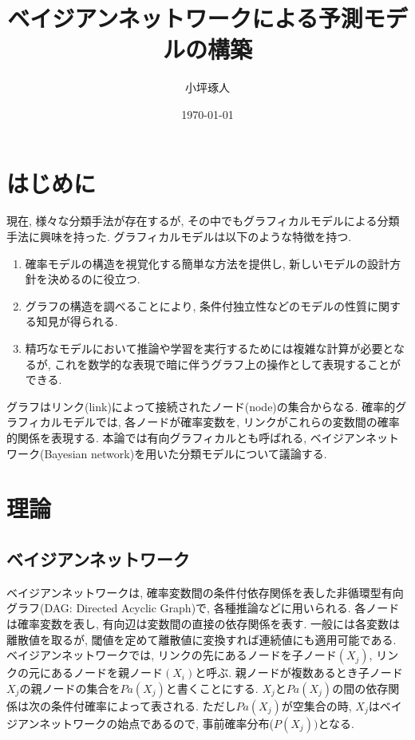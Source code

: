 \documentclass[a4j,12pt]{jarticle}
\title{ベイジアンネットワークによる予測モデルの構築}   %
\author{小坪琢人}   %
\date{\today}   %
\begin{document}
\maketitle   %
\setlength{\baselineskip}{20pt}   %
\tableofcontents   %
\listoffigures   %
\listoftables   %
\clearpage   %


\section{はじめに}

現在, 様々な分類手法が存在するが, その中でもグラフィカルモデルによる分類手法に興味を持った. グラフィカルモデルは以下のような特徴を持つ.~\cite{Bishop1}~\cite{Bishop2}

\begin{enumerate}

\item 確率モデルの構造を視覚化する簡単な方法を提供し, 新しいモデルの設計方針を決めるのに役立つ.

\item グラフの構造を調べることにより, 条件付独立性などのモデルの性質に関する知見が得られる.

\item 精巧なモデルにおいて推論や学習を実行するためには複雑な計算が必要となるが, これを数学的な表現で暗に伴うグラフ上の操作として表現することができる.

\end{enumerate}

グラフはリンク(link)によって接続されたノード(node)の集合からなる. 確率的グラフィカルモデルでは, 各ノードが確率変数を, リンクがこれらの変数間の確率的関係を表現する. 本論では有向グラフィカルとも呼ばれる, ベイジアンネットワーク(Bayesian network)を用いた分類モデルについて議論する.

\section{理論}

\subsection{ベイジアンネットワーク}

ベイジアンネットワークは, 確率変数間の条件付依存関係を表した非循環型有向グラフ(DAG: Directed Acyclic Graph)で, 各種推論などに用いられる. 各ノードは確率変数を表し, 有向辺は変数間の直接の依存関係を表す. 一般には各変数は離散値を取るが, 閾値を定めて離散値に変換すれば連続値にも適用可能である. ベイジアンネットワークでは, リンクの先にあるノードを子ノード$(X_j)$, リンクの元にあるノードを親ノード$(X_i)$と呼ぶ. 親ノードが複数あるとき子ノード$X_j$の親ノードの集合を$Pa(X_j)$と書くことにする. $X_j$と$Pa(X_j)$の間の依存関係は次の条件付確率によって表される. ただし$Pa(X_j)$が空集合の時, $X_j$はベイジアンネットワークの始点であるので, 事前確率分布($P(X_j))$となる.
\end{document}
